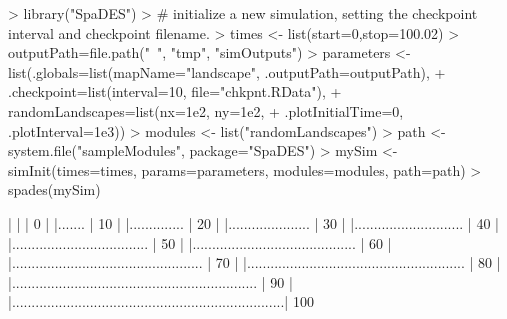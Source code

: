 \documentclass{article}
\begin{document}
\begin{Schunk}
\begin{Sinput}
> library("SpaDES")
> # initialize a new simulation, setting the checkpoint interval and checkpoint filename.
> times <- list(start=0,stop=100.02)
> outputPath=file.path("~", "tmp", "simOutputs")
> parameters <- list(.globals=list(mapName="landscape", .outputPath=outputPath),
+                    .checkpoint=list(interval=10, file="chkpnt.RData"),
+                    randomLandscapes=list(nx=1e2, ny=1e2,
+                      .plotInitialTime=0, .plotInterval=1e3))
> modules <- list("randomLandscapes")
> path <- system.file("sampleModules", package="SpaDES")
> mySim <- simInit(times=times, params=parameters, modules=modules, path=path)
> spades(mySim)
\end{Sinput}
\begin{Soutput}
  |                                                                            
  |                                                                      |   0%
  |                                                                            
  |.......                                                               |  10%
  |                                                                            
  |..............                                                        |  20%
  |                                                                            
  |.....................                                                 |  30%
  |                                                                            
  |............................                                          |  40%
  |                                                                            
  |...................................                                   |  50%
  |                                                                            
  |..........................................                            |  60%
  |                                                                            
  |.................................................                     |  70%
  |                                                                            
  |........................................................              |  80%
  |                                                                            
  |...............................................................       |  90%
  |                                                                            
  |......................................................................| 100%
\end{Soutput}
\end{Schunk}
\end{document}

